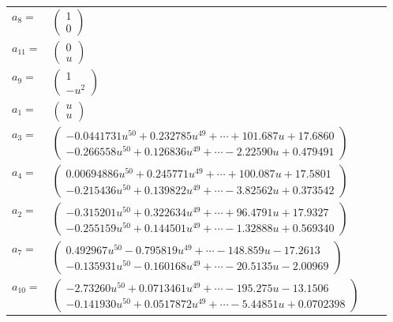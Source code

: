 \documentclass[1p]{elsarticle_modified}
\theoremstyle{definition}
\begin{document}
\begin{tabular}{m{7pt} m{180pt} m{7pt} m{180pt} }
\flushright $a_{8}=$&$\begin{pmatrix}1\\0\end{pmatrix}$ \\
\flushright $a_{11}=$&$\begin{pmatrix}0\\u\end{pmatrix}$ \\
\flushright $a_{9}=$&$\begin{pmatrix}1\\- u^2\end{pmatrix}$ \\
\flushright $a_{1}=$&$\begin{pmatrix}u\\u\end{pmatrix}$ \\
\flushright $a_{3}=$&$\begin{pmatrix}-0.0441731 u^{50}+0.232785 u^{49}+\cdots+101.687 u+17.6860\\-0.266558 u^{50}+0.126836 u^{49}+\cdots-2.22590 u+0.479491\end{pmatrix}$ \\
\flushright $a_{4}=$&$\begin{pmatrix}0.00694886 u^{50}+0.245771 u^{49}+\cdots+100.087 u+17.5801\\-0.215436 u^{50}+0.139822 u^{49}+\cdots-3.82562 u+0.373542\end{pmatrix}$ \\
\flushright $a_{2}=$&$\begin{pmatrix}-0.315201 u^{50}+0.322634 u^{49}+\cdots+96.4791 u+17.9327\\-0.255159 u^{50}+0.144501 u^{49}+\cdots-1.32888 u+0.569340\end{pmatrix}$ \\
\flushright $a_{7}=$&$\begin{pmatrix}0.492967 u^{50}-0.795819 u^{49}+\cdots-148.859 u-17.2613\\-0.135931 u^{50}-0.160168 u^{49}+\cdots-20.5135 u-2.00969\end{pmatrix}$ \\
\flushright $a_{10}=$&$\begin{pmatrix}-2.73260 u^{50}+0.0713461 u^{49}+\cdots-195.275 u-13.1506\\-0.141930 u^{50}+0.0517872 u^{49}+\cdots-5.44851 u+0.0702398\end{pmatrix}$ \\

\end{tabular}
\end{document}

